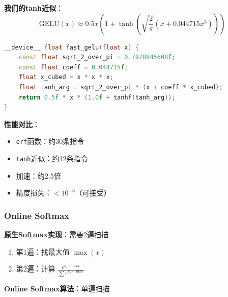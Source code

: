 \documentclass[12pt,a4paper]{article}
\begin{document}
\textbf{我们的tanh近似}：
\begin{equation}
    \text{GELU}(x) \approx 0.5x \left(1 + \tanh\left(\sqrt{\frac{2}{\pi}} (x + 0.044715x^3)\right)\right)
\end{equation}

\begin{lstlisting}[language=C++,caption=Fast GELU实现]
__device__ float fast_gelu(float x) {
    const float sqrt_2_over_pi = 0.7978845608f;
    const float coeff = 0.044715f;
    float x_cubed = x * x * x;
    float tanh_arg = sqrt_2_over_pi * (x + coeff * x_cubed);
    return 0.5f * x * (1.0f + tanhf(tanh_arg));
}
\end{lstlisting}

\textbf{性能对比}：
\begin{itemize}
    \item \texttt{erf}函数：约30条指令
    \item \texttt{tanh}近似：约12条指令
    \item 加速：约2.5倍
    \item 精度损失：$< 10^{-3}$（可接受）
\end{itemize}

\subsubsection{Online Softmax}

\textbf{原生Softmax实现}：需要2遍扫描
\begin{enumerate}
    \item 第1遍：找最大值 $\max(x)$
    \item 第2遍：计算 $\frac{e^{x_i - \max}}{\sum e^{x_j - \max}}$
\end{enumerate}

\textbf{Online Softmax算法}：单遍扫描
\end{document}
